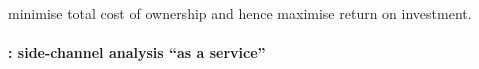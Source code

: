 %
%
%
%

 minimise total cost of ownership
and hence maximise return on investment.


\paragraph{\LABID: side-channel analysis ``as a service''}


